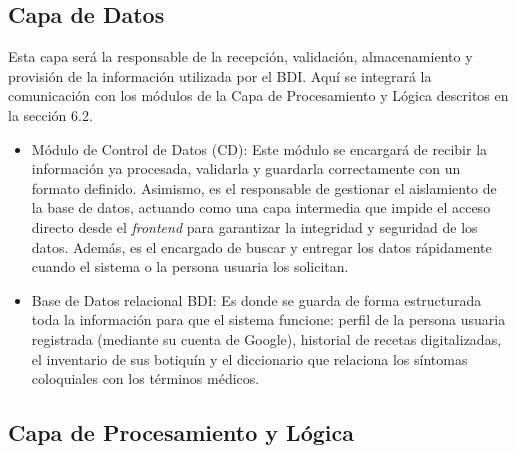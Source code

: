 \subsection{Capa de Datos}
Esta capa será la responsable de la recepción, validación, almacenamiento y provisión de la información utilizada por el BDI. Aquí se integrará la comunicación con los módulos de la Capa de Procesamiento y Lógica descritos en la sección 6.2.
\begin{itemize}
        \item Módulo de Control de Datos (CD): Este módulo se encargará de recibir la información ya procesada, validarla y guardarla correctamente con un formato definido. Asimismo, es el responsable de gestionar el aislamiento de la base de datos, actuando como una capa intermedia que impide el acceso directo desde el \emph{frontend} para garantizar la integridad y seguridad de los datos. Además, es el encargado de buscar y entregar los datos rápidamente cuando el sistema o la persona usuaria los solicitan.
        
        \item Base de Datos relacional BDI: Es donde se guarda de forma estructurada toda la información para que el sistema funcione: perfil de la persona usuaria registrada (mediante su cuenta de Google), historial de recetas digitalizadas, el inventario de sus botiquín y el diccionario que relaciona los síntomas coloquiales con los términos médicos.
    \end{itemize}


\subsection{Capa de Procesamiento y Lógica}

